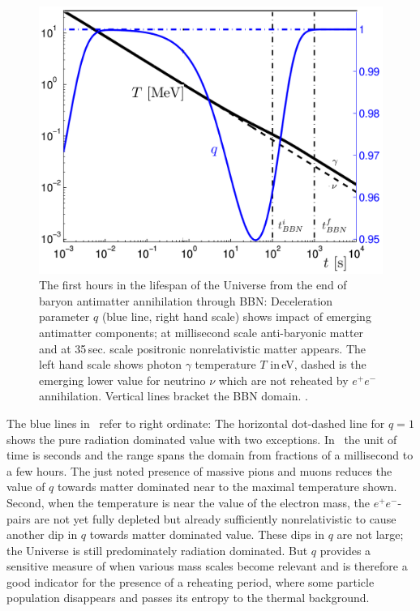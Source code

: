 \begin{figure}
\centerline{\includegraphics[width=0.90\linewidth]{plots/TqBBN.png}}
\caption{The first hours in the lifespan of the Universe from the end of baryon antimatter annihilation through BBN: Deceleration parameter $q$ (blue line, right hand scale) shows impact of emerging antimatter components; at millisecond scale anti-baryonic matter and at 35\,sec. scale positronic nonrelativistic matter appears. The left hand scale shows photon $\gamma$ temperature $T$ in\,eV, dashed is the emerging lower value for neutrino $\nu$ which are not reheated by $e^+e^-$ annihilation. Vertical lines bracket the BBN domain. . } 
\label{fig:BBN}
\end{figure}

The blue lines in~ refer to right ordinate: The horizontal dot-dashed line for $q=1$ shows the pure radiation dominated value with two exceptions. In~ the unit of time is seconds and the range spans the domain from fractions of a millisecond to a few hours. The just noted presence of massive pions and muons reduces the value of $q$ towards matter dominated near to the maximal temperature shown. Second, when the temperature is near the value of the electron mass, the $e^+e^-$-pairs are not yet fully depleted but already sufficiently nonrelativistic to cause another dip in $q$ towards matter dominated value. These dips in $q$ are not large; the Universe is still predominately radiation dominated. But $q$ provides a sensitive measure of when various mass scales become relevant and is therefore a good indicator for the presence of a reheating period, where some particle population disappears and passes its entropy to the thermal background.


